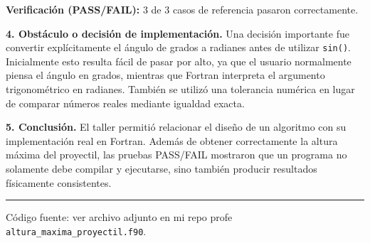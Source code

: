 \documentclass[11pt]{article}
\begin{document}
\textbf{Verificación (PASS/FAIL):} 3 de 3 casos de referencia pasaron correctamente.


\textbf{4. Obstáculo o decisión de implementación.}
Una decisión importante fue convertir explícitamente el ángulo de grados a radianes antes de utilizar \texttt{sin()}. Inicialmente esto resulta fácil de pasar por alto, ya que el usuario normalmente piensa el ángulo en grados, mientras que Fortran interpreta el argumento trigonométrico en radianes. También se utilizó una tolerancia numérica en lugar de comparar números reales mediante igualdad exacta.


\textbf{5. Conclusión.}
El taller permitió relacionar el diseño de un algoritmo con su implementación real en Fortran. Además de obtener correctamente la altura máxima del proyectil, las pruebas PASS/FAIL mostraron que un programa no solamente debe compilar y ejecutarse, sino también producir resultados físicamente consistentes.

\vspace{4pt}
\hrule
\vspace{4pt}

{\small Código fuente: ver archivo adjunto en mi repo profe
\texttt{altura\_maxima\_proyectil.f90}.}
\end{document}
